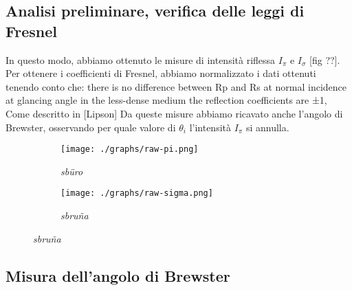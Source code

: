 \subsection{Analisi preliminare, verifica delle leggi di Fresnel}\label{subsec:analisi-dati}
  In questo modo, abbiamo ottenuto le misure di intensità riflessa $I_\pi$ e $I_\sigma$ [fig ??]. Per ottenere i
  coefficienti di Fresnel, abbiamo normalizzato i dati ottenuti tenendo conto che:
  there is no difference between Rp and Rs at normal incidence
  at glancing angle in the less-dense medium the reflection coefficients are ±1,
  Come descritto in [Lipson]
  Da queste misure abbiamo ricavato anche l’angolo di Brewster, osservando per quale valore di $\theta_i$
  l’intensità $I_\pi$ si annulla.

  \begin{figure}[h]
    \centering
    \caption{Sburino}
    \begin{subfigure}{.4\textwidth}
      \texttt{[image: ./graphs/raw-pi.png]}
      \caption{
        \emph{
          sbüro
        }
      }
      \label{fig:raw-pi}
    \end{subfigure}%
    \hspace{20mm}
    \begin{subfigure}{.4\textwidth}
      \texttt{[image: ./graphs/raw-sigma.png]}
      \caption{
        \emph{
          sbruña
        }
      }
      \label{fig:raw-sigma}
    \end{subfigure}
  \end{figure}
\subsection{Misura dell'angolo di Brewster}\label{subsec:angolo-di-brewster}
  \blindtext[2]
\endinput



